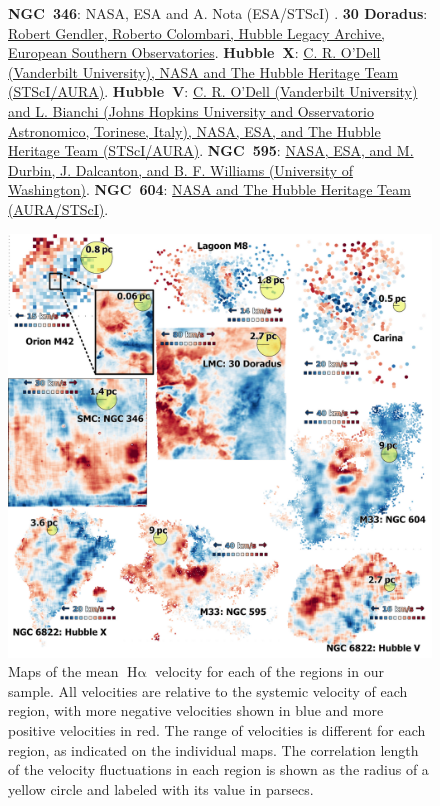 \documentclass[fleqn,usenatbib, useAMS, a4paper]{mnras}
\newcommand\ha{\ensuremath{\text{H}\upalpha}}
\begin{document}
\begin{figure}
{    \textbf{NGC~346}:
    NASA, ESA and A. Nota (ESA/STScI) \citep{Nota:2006x}.
    \textbf{30 Doradus}:
    \href{http://www.robgendlerastropics.com/Tarantula-HST-ESO.html}{
      Robert Gendler, Roberto Colombari,
      Hubble Legacy Archive, European Southern Observatories}.
    \textbf{Hubble~X}:
    \href{https://hubblesite.org/contents/media/images/2001/01/1012-Image.html}
    {C. R. O'Dell (Vanderbilt University),
      NASA and The Hubble Heritage Team (STScI/AURA)}.
    \textbf{Hubble~V}:
    \href{https://hubblesite.org/contents/media/images/2001/39/1126-Image.html}
    {C. R. O'Dell (Vanderbilt University)
      and L. Bianchi (Johns Hopkins University and Osservatorio Astronomico, Torinese, Italy),
      NASA, ESA, and The Hubble Heritage Team (STScI/AURA)}.
    \textbf{NGC~595}:
    \href{https://esahubble.org/images/heic1901c/}
    {NASA, ESA,
      and M. Durbin, J. Dalcanton, and B. F. Williams (University of Washington)}.
    \textbf{NGC~604}:
    \href{https://hubblesite.org/contents/media/images/2003/30/1423-Image.html}
    {NASA and The Hubble Heritage Team (AURA/STScI)}.
  }
  \label{fig:hii-regions}
\end{figure}

\begin{figure}
  \centering
  \includegraphics[width=\linewidth]{Figures/velocity-maps-mosaic}
  \caption{
    Maps of the mean \ha{} velocity for each of the regions in our sample.
    All velocities are relative to the systemic velocity of each region,
    with more negative velocities shown in blue and more positive velocities in red.
    The range of velocities is different for each region, as indicated on the individual maps.
    The correlation length of the velocity fluctuations in each region
    is shown as the radius of a yellow circle and labeled with its value in parsecs. 
  }
  \label{fig:velocity-maps}
\end{figure}
\end{document}
